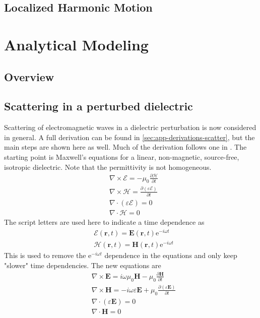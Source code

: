 \documentclass[10pt,a4paper]{eitExjobb}
\begin{document}
	\section{Localized Harmonic Motion}
	
	\chapter{Analytical Modeling \label{ch:analytical}}
	
	\section{Overview}
	
	\section{Scattering in a perturbed dielectric \label{sec:analytical-scatter}}
	Scattering of electromagnetic waves in a dielectric perturbation is now considered in general. A full derivation can be found in \ref{sec:app-derivations-scatter}, but the main steps are shown here as well. Much of the derivation follows one in \cite{Tatarskii1971}. The starting point is Maxwell's equations for a linear, non-magnetic, source-free, isotropic dielectric. Note that the permittivity is not homogeneous.
	\begin{align*}
	&\nabla \times \bm{\mathcal{E}} = -\mu_0 \frac{\partial \bm{\mathcal{H}}}{\partial t} \\
	&\nabla \times \bm{\mathcal{H}} = \frac{\partial (\varepsilon \bm{\mathcal{E}})}{\partial t} \\
	&\nabla \cdot (\varepsilon \bm{\mathcal{E}}) = 0 \\
	&\nabla \cdot \bm{\mathcal{H}} = 0
	\end{align*}
	The script letters are used here to indicate a time dependence as
	\begin{align*}
	&\bm{\mathcal{E}}(\bm{r},t) = \bm{E}(\bm{r},t) \text{e}^{-i\omega t} \\
	&\bm{\mathcal{H}}(\bm{r},t) = \bm{H}(\bm{r},t) \text{e}^{-i\omega t}
	\end{align*}
	This is used to remove the e$^{-i\omega t}$ dependence in the equations and only keep "slower" time dependencies. The new equations are
	\begin{align*}
	&\nabla \times \bm{E} = i\omega \mu_0 \bm{H} - \mu_0 \frac{\partial \bm{H}}{\partial t} \\
	&\nabla \times \bm{H} = -i\omega \varepsilon \bm{E} + \mu_0 \frac{\partial (\varepsilon \bm{E})}{\partial t} \\
	&\nabla \cdot (\varepsilon \bm{E}) = 0 \\
	&\nabla \cdot \bm{H} = 0
	\end{align*}
\end{document}
